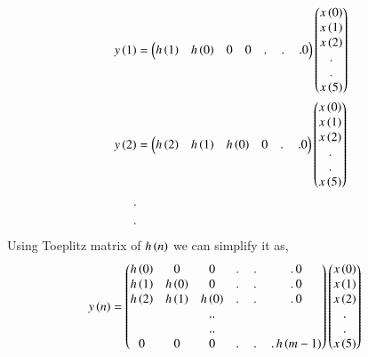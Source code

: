 \documentclass[journal,12pt,twocolumn]{IEEEtran}
\renewcommand\thesection{\arabic{section}}
\begin{document}
\begin{enumerate}[label=\thesection.\arabic*]
\begin{align}
		y\left(1\right) &= \begin{pmatrix}h\left(1\right) & h\left(0\right) & 0 & 0 &.\,&.\,&.0\end{pmatrix}\begin{pmatrix}x\left(0\right)\\x\left(1\right)\\x\left(2\right)\\ . \\.\\x\left(5\right)\end{pmatrix}\\
		y\left(2\right) &= \begin{pmatrix}h\left(2\right) & h\left(1\right) & h\left(0\right) & 0& .\,&.0\end{pmatrix}\begin{pmatrix}x\left(0\right)\\x\left(1\right)\\x\left(2\right)\\ . \\.\\x\left(5\right)\end{pmatrix}\\
		. & \nonumber \\
		.& \nonumber
	\end{align}
	Using Toeplitz matrix of $h\left(n\right)$ we can simplify it as,
	\begin{align}
		y\left(n\right) &= \begin{pmatrix}h\left(0\right) & 0 & 0 &.\,&.\,&.\,0 \\
			h\left(1\right) & h\left(0\right) & 0 & .\,&.\,&.\,0 \\
			h\left(2\right) & h\left(1\right) & h\left(0\right) & .\,&.\,&.\,0 \\
			&&..\\&&..\\ 0 & 0 &  0 &.\,&.\,&.\, h\left(m-1\right)\end{pmatrix}\begin{pmatrix}x\left(0\right)\\x\left(1\right)\\x\left(2\right)\\ . \\.\\x\left(5\right)\end{pmatrix}\label{eq:5.9}
	\end{align}
	

\end{enumerate}
\end{document}

